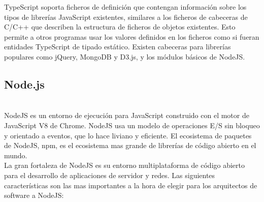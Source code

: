\documentclass[a4paper, 11pt]{article}
\begin{document}
\begin{itemize}
          TypeScript soporta ficheros de definición que contengan información sobre
          los tipos de librerías JavaScript existentes, similares a los ficheros de
          cabeceras de C/C++ que describen la estructura de ficheros de objetos
          existentes. Esto permite a otros programas usar los valores definidos en
          los ficheros como si fueran entidades TypeScript de tipado estático.
          Existen cabeceras para librerías populares como jQuery, MongoDB y D3.js, y
          los módulos básicos de NodeJS.

        \subsection{Node.js}\\

          NodeJS es un entorno de ejecución para JavaScript construido con el
          motor de JavaScript V8 de Chrome. NodeJS usa un modelo de operaciones E/S
          sin bloqueo y orientado a eventos, que lo hace liviano y eficiente. El
          ecosistema de paquetes de NodeJS, npm, es el ecosistema mas grande de
          librerías de código abierto en el mundo.\\

          La gran fortaleza de NodeJS es su entorno multiplataforma de código
          abierto para el desarrollo de aplicaciones de servidor y redes. Las
          siguientes características son las mas importantes a la hora de elegir
          para los arquitectos de software a NodeJS:\\


\end{itemize}
\end{document}
